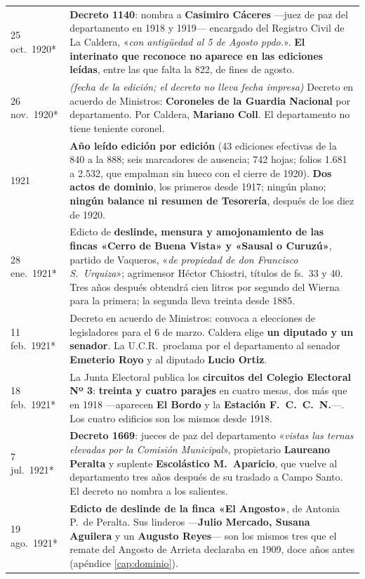 \begin{longtable}{@{}p{2.7cm}p{10.3cm}@{}}
25 oct.\ 1920* & \textbf{Decreto 1140}: nombra a \textbf{Casimiro Cáceres} ---juez de paz del departamento en 1918 y 1919--- encargado del Registro Civil de La Caldera, «\textit{con antigüedad al 5 de Agosto ppdo.}». \textbf{El interinato que reconoce no aparece en las ediciones leídas}, entre las que falta la 822, de fines de agosto. \\
26 nov.\ 1920* & \textit{(fecha de la edición; el decreto no lleva fecha impresa)} Decreto en acuerdo de Ministros: \textbf{Coroneles de la Guardia Nacional} por departamento. Por Caldera, \textbf{Mariano Coll}. El departamento no tiene teniente coronel. \\
1921 & \textbf{Año leído edición por edición} (43 ediciones efectivas de la 840 a la 888; seis marcadores de ausencia; 742 hojas; folios 1.681 a 2.532, que empalman sin hueco con el cierre de 1920). \textbf{Dos actos de dominio}, los primeros desde 1917; ningún plano; \textbf{ningún balance ni resumen de Tesorería}, después de los diez de 1920. \\
28 ene.\ 1921* & Edicto de \textbf{deslinde, mensura y amojonamiento de las fincas «Cerro de Buena Vista» y «Sausal o Curuzú»}, partido de Vaqueros, «\textit{de propiedad de don Francisco S.\ Urquiza}»\index{Urquiza, Francisco S.}; agrimensor Héctor Chiostri, títulos de fs.\ 33 y 40. Tres años después obtendrá cien litros por segundo del Wierna para la primera; la segunda lleva treinta desde 1885. \\
11 feb.\ 1921* & Decreto en acuerdo de Ministros: convoca a elecciones de legisladores para el 6 de marzo. Caldera elige \textbf{un diputado y un senador}. La U.C.R.\ proclama por el departamento al senador \textbf{Emeterio Royo} y al diputado \textbf{Lucio Ortiz}. \\
18 feb.\ 1921* & La Junta Electoral publica los \textbf{circuitos del Colegio Electoral Nº 3}: \textbf{treinta y cuatro parajes} en cuatro mesas, dos más que en 1918 ---aparecen \textbf{El Bordo} y la \textbf{Estación F.\ C.\ C.\ N.}---. Los cuatro edificios son los mismos desde 1918. \\
7 jul.\ 1921* & \textbf{Decreto 1669}: jueces de paz del departamento «\textit{vistas las ternas elevadas por la Comisión Municipal}», propietario \textbf{Laureano Peralta} y suplente \textbf{Escolástico M.\ Aparicio}\index{Aparicio, Escolástico M.}, que vuelve al departamento tres años después de su traslado a Campo Santo. El decreto no nombra a los salientes. \\
19 ago.\ 1921* & \textbf{Edicto de deslinde de la finca «El Angosto»}, de Antonia P.\ de Peralta. Sus linderos ---\textbf{Julio Mercado, Susana Aguilera} y un \textbf{Augusto Reyes}--- son los mismos tres que el remate del Angosto de Arrieta declaraba en 1909, doce años antes (apéndice \ref{cap:dominio}). \\

\end{longtable}
